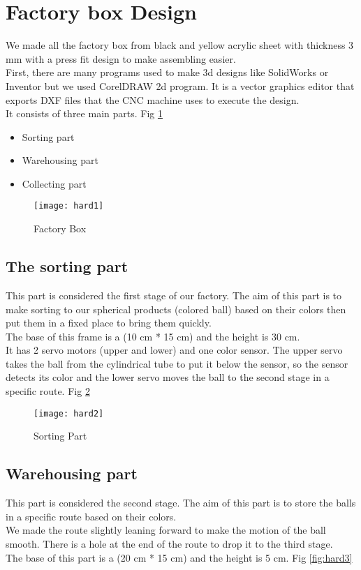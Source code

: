 \section{Factory box Design}
We made all the factory box from black and yellow acrylic sheet with thickness 3 mm with a press fit
design to make assembling easier.\\
First, there are many programs used to make 3d designs like SolidWorks or Inventor but we used
CorelDRAW 2d program. It is a vector graphics editor that exports DXF files that the CNC machine
uses to execute the design.\\
It consists of three main parts. Fig \ref{fig:hard1}
\begin{itemize}
    \item Sorting part
    \item Warehousing part
    \item Collecting part
\end{itemize}

\begin{figure}[h]
    \texttt{[image: hard1]}
    \centering
    \caption{Factory Box}
    \label{fig:hard1}
\end{figure}

\subsection{The sorting part}
This part is considered the first stage of our factory. The aim of this part is to make sorting to our
spherical products (colored ball) based on their colors then put them in a fixed place to bring them
quickly.\\
The base of this frame is a (10 cm * 15 cm) and the height is 30 cm.\\
It has 2 servo motors (upper and lower) and one color sensor. The upper servo takes the ball from the
cylindrical tube to put it below the sensor, so the sensor detects its color and the lower servo moves
the ball to the second stage in a specific route. Fig \ref{fig:hard2}

\begin{figure}[h]
    \texttt{[image: hard2]}
    \centering
    \caption{Sorting Part}
    \label{fig:hard2}
\end{figure}


\subsection{Warehousing part}
This part is considered the second stage. The aim of this part is to store the balls in a specific route
based on their colors.\\
We made the route slightly leaning forward to make the motion of the ball smooth.
There is a hole at the end of the route to drop it to the third stage.\\
The base of this part is a (20 cm * 15 cm) and the height is 5 cm. Fig \ref{fig:hard3}

